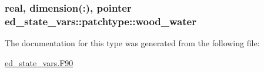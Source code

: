 \subsubsection[{\texorpdfstring{wood\+\_\+water}{wood_water}}]{\setlength{\rightskip}{0pt plus 5cm}real, dimension(\+:), pointer ed\+\_\+state\+\_\+vars\+::patchtype\+::wood\+\_\+water}\hypertarget{structed__state__vars_1_1patchtype_ac3f6f7736a11aac4fc18dc2f9b5e00ce}{}\label{structed__state__vars_1_1patchtype_ac3f6f7736a11aac4fc18dc2f9b5e00ce}


The documentation for this type was generated from the following file\+:\begin{DoxyCompactItemize}
\item 
\hyperlink{ed__state__vars_8_f90}{ed\+\_\+state\+\_\+vars.\+F90}\end{DoxyCompactItemize}
